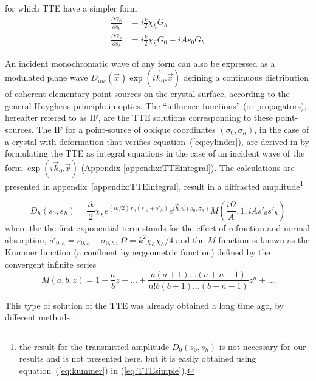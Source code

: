 \documentclass[preprint]{iucr}              %
\newcommand{\inred}[1]{{\color{red}#1}}
\begin{document}
for which TTE have a simpler form
  \begin{subequations}
    \label{eq:TTEsimple}
    \begin{align}
      \frac{\partial G_0}{\partial s_0} &= i \frac{k}{2}\chi_{\bar{h}} G_h
      \\
      \frac{\partial G_h}{\partial s_h} &= i \frac{k}{2}\chi_{\bar{h}} G_0 - i A s_0 G_h
    \end{align}
  \end{subequations}

An incident monochromatic wave of any form can also be expressed as a modulated plane wave $D_{inc}(\vec x)\exp(i \vec k_0 . \vec x)$ defining a continuous distribution of coherent elementary point-sources on the crystal surface, according to the general Huyghens principle in optics. The “influence functions” (or propagators), hereafter refered to as IF, are the TTE solutions corresponding to these point-sources. The IF for a point-source of  oblique coordinates $(\sigma_0,\sigma_h)$, in the case of  a crystal with deformation that verifies equation~(\ref{eq:cylinder}), are derived in \cite{GuigayFerrero2016} by formulating the TTE  as integral equations in the case of an incident wave of the form \inred{$\exp(i \vec k_0 . \vec x)$ (Appendix \ref{appendix:TTEintegral})}. The calculations are presented in appendix~\ref{appendix:TTEintegral}, result in a diffracted amplitude\footnote{the result for the transmitted amplitude $D_0(s_0,s_h)$ is not necessary for our results and is not presented here, but it is easily obtained using equation~(\ref{eq:kummer}) in (\ref{eq:TTEsimple}).}

  
\begin{equation}
\label{eq:kummer}
    D_h(s_0,s_h) = \frac{i k }{2} \chi_h e^{(ik/2) \chi_0 (s'_0 + s'_h)} e^{i \vec h . \vec u (s_0,\sigma_h)} M(\frac{i\Omega}{A},1,iA s'_0 s'_h)
\end{equation}
where the the first exponential term stands for the effect of refraction and normal absorption, $s'_{0,h}=s_{0,h}-\sigma_{0,h}$, $\Omega=k^2\chi_h\chi_{\bar{h}}/4$ and the $M$ function is known as the Kummer function (a confluent hypergeometric function) defined by the convergent infinite series
\begin{equation}
\label{eq:kummerSeries}
    M(a,b,z) = 1 + \frac{a}{b} z + 
    ... + \frac{a(a+1)...(a+n-1)}{n! b (b+1)...(b+n-1)}z^n+...
\end{equation}

This type of solution of the TTE was already obtained a long time ago, by different methods \cite{Petrashen1974,Katagawa1974,Litzmann1974,Chukhovski1977}.
\end{document}
